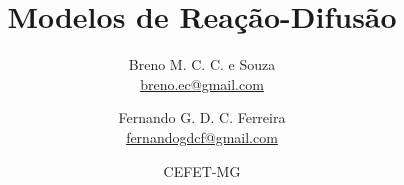 
\title{\vspace{-15mm}\fontsize{24pt}{10pt}\selectfont\textbf{Modelos de Reação-Difusão}} %

\author{
    Breno M. C. C. e Souza\\
    \href{mailto:breno.ec@gmail.com}{breno.ec@gmail.com}\\
  \and
    Fernando G. D. C. Ferreira\\
    \href{mailto:fernandogdcf@gmail.com}{fernandogdcf@gmail.com}\\
}

\date{CEFET-MG} %
